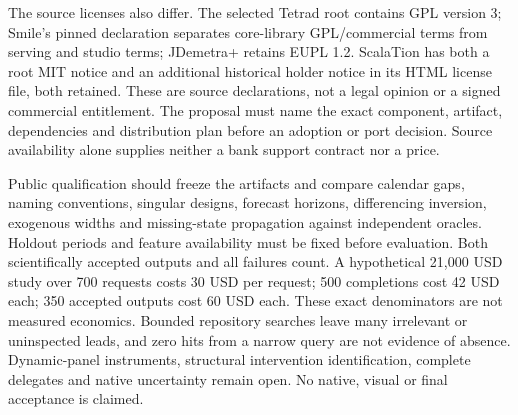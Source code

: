 The source licenses also differ. The selected Tetrad root contains GPL version 3; Smile's pinned declaration separates core-library GPL/commercial terms from serving and studio terms; JDemetra+ retains EUPL 1.2. ScalaTion has both a root MIT notice and an additional historical holder notice in its HTML license file, both retained. These are source declarations, not a legal opinion or a signed commercial entitlement. The proposal must name the exact component, artifact, dependencies and distribution plan before an adoption or port decision. Source availability alone supplies neither a bank support contract nor a price.\citep{exec25_jdyn_tetrad,exec25_jdyn_smile,exec25_jdyn_scalation,exec25_jdyn_jdplus}

Public qualification should freeze the artifacts and compare calendar gaps, naming conventions, singular designs, forecast horizons, differencing inversion, exogenous widths and missing-state propagation against independent oracles. Holdout periods and feature availability must be fixed before evaluation. Both scientifically accepted outputs and all failures count. A hypothetical 21,000 USD study over 700 requests costs 30 USD per request; 500 completions cost 42 USD each; 350 accepted outputs cost 60 USD each. These exact denominators are not measured economics. Bounded repository searches leave many irrelevant or uninspected leads, and zero hits from a narrow query are not evidence of absence. Dynamic-panel instruments, structural intervention identification, complete delegates and native uncertainty remain open. No native, visual or final acceptance is claimed.\citep{exec25_jdyn_choice}
